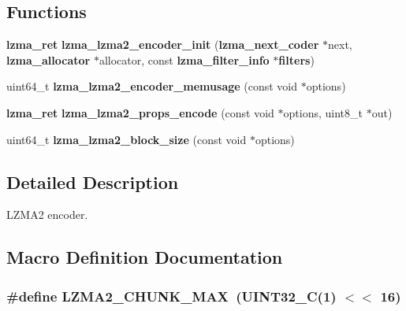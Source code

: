 \subsection*{Functions}
\begin{DoxyCompactItemize}
\item 
{\bf lzma\-\_\-ret} {\bfseries lzma\-\_\-lzma2\-\_\-encoder\-\_\-init} ({\bf lzma\-\_\-next\-\_\-coder} $\ast$next, {\bf lzma\-\_\-allocator} $\ast$allocator, const {\bf lzma\-\_\-filter\-\_\-info} $\ast${\bf filters})\label{lzma2__encoder_8h_afb56adb52d38d5bd3b655056b913d915}

\item 
uint64\-\_\-t {\bfseries lzma\-\_\-lzma2\-\_\-encoder\-\_\-memusage} (const void $\ast$options)\label{lzma2__encoder_8h_afff5740f7004ed7d3c7b67c3671a30c0}

\item 
{\bf lzma\-\_\-ret} {\bfseries lzma\-\_\-lzma2\-\_\-props\-\_\-encode} (const void $\ast$options, uint8\-\_\-t $\ast$out)\label{lzma2__encoder_8h_aecbff0af1269d11accb87f956e2609d4}

\item 
uint64\-\_\-t {\bfseries lzma\-\_\-lzma2\-\_\-block\-\_\-size} (const void $\ast$options)\label{lzma2__encoder_8h_ae1c48f80b363367e094795c60f466624}

\end{DoxyCompactItemize}


\subsection{Detailed Description}
L\-Z\-M\-A2 encoder. 

\subsection{Macro Definition Documentation}
\subsubsection[{L\-Z\-M\-A2\-\_\-\-C\-H\-U\-N\-K\-\_\-\-M\-A\-X}]{\setlength{\rightskip}{0pt plus 5cm}\#define L\-Z\-M\-A2\-\_\-\-C\-H\-U\-N\-K\-\_\-\-M\-A\-X~(U\-I\-N\-T32\-\_\-\-C(1) $<$$<$ 16)}\label{lzma2__encoder_8h_a8d74c156d01559e0282d9af9c6279e03}


